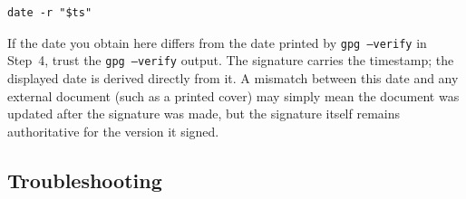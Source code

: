 \begin{lstlisting}[style=code]
date -r "$ts"
\end{lstlisting}

If the date you obtain here differs from the date printed by
\texttt{gpg --verify} in Step~4, trust the \texttt{gpg --verify}
output. The signature carries the timestamp; the displayed date is
derived directly from it. A mismatch between this date and any
external document (such as a printed cover) may simply mean the
document was updated after the signature was made, but the
signature itself remains authoritative for the version it signed.

\subsection*{Troubleshooting}

